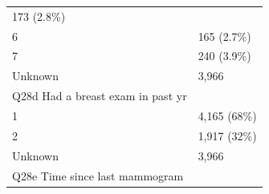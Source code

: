 \documentclass[]{article}
\begin{document}
\begin{longtable}[]{@{}ll@{}}
\begin{minipage}[t]{0.23\columnwidth}
173 (2.8\%)\strut
\end{minipage}\tabularnewline
\begin{minipage}[t]{0.71\columnwidth}\raggedright
6\strut
\end{minipage} & \begin{minipage}[t]{0.23\columnwidth}\raggedright
165 (2.7\%)\strut
\end{minipage}\tabularnewline
\begin{minipage}[t]{0.71\columnwidth}\raggedright
7\strut
\end{minipage} & \begin{minipage}[t]{0.23\columnwidth}\raggedright
240 (3.9\%)\strut
\end{minipage}\tabularnewline
\begin{minipage}[t]{0.71\columnwidth}\raggedright
Unknown\strut
\end{minipage} & \begin{minipage}[t]{0.23\columnwidth}\raggedright
3,966\strut
\end{minipage}\tabularnewline
\begin{minipage}[t]{0.71\columnwidth}\raggedright
Q28d Had a breast exam in past yr\strut
\end{minipage} & \begin{minipage}[t]{0.23\columnwidth}\raggedright
\strut
\end{minipage}\tabularnewline
\begin{minipage}[t]{0.71\columnwidth}\raggedright
1\strut
\end{minipage} & \begin{minipage}[t]{0.23\columnwidth}\raggedright
4,165 (68\%)\strut
\end{minipage}\tabularnewline
\begin{minipage}[t]{0.71\columnwidth}\raggedright
2\strut
\end{minipage} & \begin{minipage}[t]{0.23\columnwidth}\raggedright
1,917 (32\%)\strut
\end{minipage}\tabularnewline
\begin{minipage}[t]{0.71\columnwidth}\raggedright
Unknown\strut
\end{minipage} & \begin{minipage}[t]{0.23\columnwidth}\raggedright
3,966\strut
\end{minipage}\tabularnewline
\begin{minipage}[t]{0.71\columnwidth}\raggedright
Q28e Time since last mammogram\strut
\end{minipage} & \begin{minipage}[t]{0.23\columnwidth}\raggedright

\end{minipage}
\end{longtable}
\end{document}
